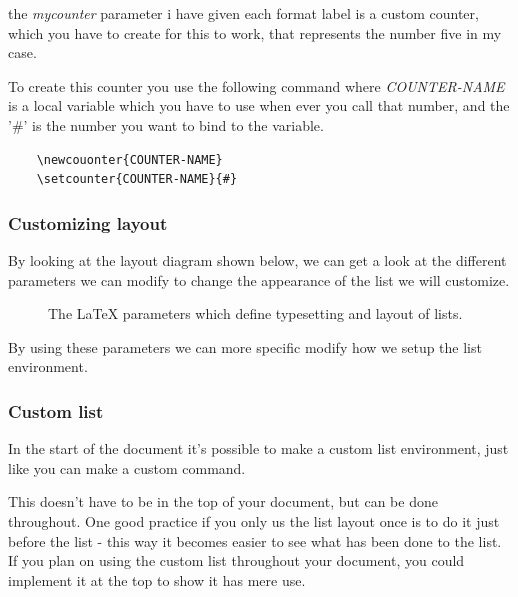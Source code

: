 \documentclass{article}
\begin{document}
the \textit{mycounter} parameter i have given each format label is a custom counter, which you have to create for this to work, 
that represents the number five in my case.

To create this counter you use the following command where \textit{COUNTER-NAME} is a local variable which you have to use when ever you call that number, and the '\#' is the number you want to bind to the variable.
\begin{verbatim}
    \newcouonter{COUNTER-NAME}
    \setcounter{COUNTER-NAME}{#}
\end{verbatim}
    
\subsubsection{Customizing layout}
By looking at the layout diagram shown below, we can get a look at the different parameters we can modify to change the appearance of the list we will customize. \\

\begin{figure} [H]
    \listdiagram
    \caption{The \LaTeX{} parameters which define typesetting and layout of lists.} 
    \label{fig:list_diagram}
\end{figure}

By using these parameters we can more specific modify how we setup the list environment. 

\subsubsection{Custom list}
In the start of the document it's possible to make a custom list environment, just like you can make a custom command.

This doesn't have to be in the top of your document, but can be done throughout. One good practice if you only us the list layout once is to do it just before the list - this way it becomes easier to see what has been done to the list. If you plan on using the custom list throughout your document, you could implement it at the top to show it has mere use.
\end{document}
